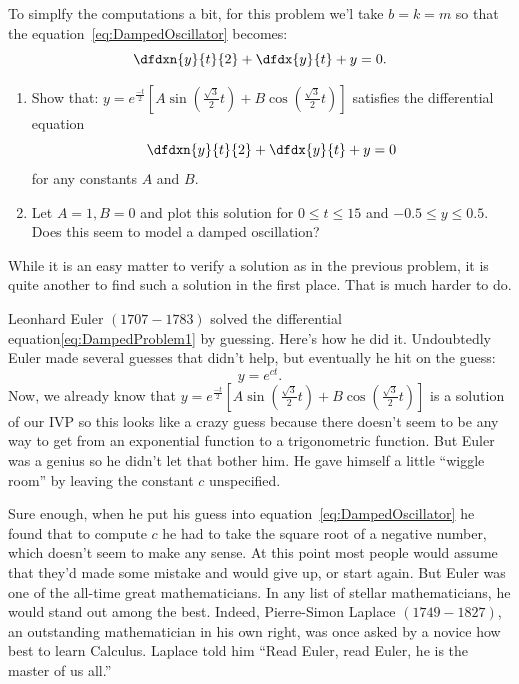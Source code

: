 \begin{embeddedproblem}{}
  To simplfy the computations a bit, for this problem we'l take
  $b=k=m$ so that the  equation~\ref{eq:DampedOscillator} becomes:
  \begin{equation}
    \dfdxn{y}{t}{2}+\dfdx{y}{t}+y=0.\label{eq:DampedProblem1}
  \end{equation}
  \begin{enumerate}[label={\bf{}(\alph*)}]{}
  \item Show that: $\displaystyle y=e^{\frac{-t}{2}}
    \left[
      A\sin\left(\frac{\sqrt{3}}{2}t\right)+B\cos\left(\frac{\sqrt{3}}{2}t\right)
    \right]$ satisfies the differential equation
    $$
    \dfdxn{y}{t}{2}+\dfdx{y}{t}+y=0
    $$
    for any constants $A$ and $B$.
  \item Let $A=1, B=0$ and plot this solution for $0\le t\le 15$
    and $-0.5\le y \le 0.5.$ Does this seem to model a damped
    oscillation?
  \end{enumerate}
\end{embeddedproblem}

While it is an easy matter to verify  a solution as in the previous
problem,  it is quite another to find such a solution in the first place.
That is much harder to do.

Leonhard Euler $(1707-1783)$ solved the differential
equation\ref{eq:DampedProblem1} by guessing. Here's how he did
it. Undoubtedly Euler made several guesses that didn't help, but
eventually he hit on the guess:
$$
y=e^{ct}.
$$
Now, we already know that
$y=e^{\frac{-t}{2}} \left[
  A\sin\left(\frac{\sqrt{3}}{2}t\right)+B\cos\left(\frac{\sqrt{3}}{2}t\right)
\right]$ is a solution of our IVP so this looks like a crazy guess
because there doesn't seem to be any way to get from an exponential
function to a trigonometric function. But Euler was a genius so he
didn't let that bother him. He gave himself a little ``wiggle room''
by leaving the constant $c$ unspecified.

Sure enough, when he put his guess into
equation~\ref{eq:DampedOscillator} he found that to compute $c$ he had
to take the square root of a negative number, which doesn't seem to
make any sense. At this point most people would
assume that they'd made some mistake and would give up, or start
again. But Euler was one of the all-time great mathematicians.  In any
list of stellar mathematicians, he would stand out among the best.
Indeed, Pierre-Simon Laplace $(1749-1827)$, an outstanding
mathematician in his own right, was once asked by a novice how best to
learn Calculus. Laplace told him ``Read Euler, read Euler, he is the
master of us all.''

